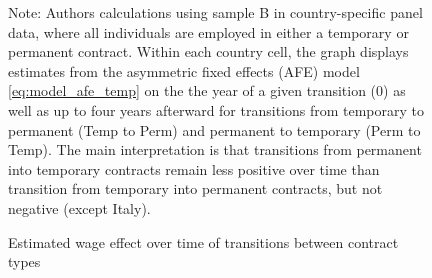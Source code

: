 \begin{figure}
    \caption{Estimated wage effect over time of transitions between contract types}
    \label{graph_contyp_post}
    \footnotesize{Note: Authors calculations using sample B in country-specific panel data, where all individuals are employed in either a temporary or permanent contract.  Within each country cell, the graph displays estimates from the asymmetric fixed effects (AFE) model \ref{eq:model_afe_temp} on the the year of a given transition (0) as well as up to four years afterward for transitions from temporary to permanent (Temp to Perm) and permanent to temporary (Perm to Temp).  The main interpretation is that transitions from permanent into temporary contracts remain less positive over time than transition from temporary into permanent contracts, but not negative (except Italy).}
\end{figure}

